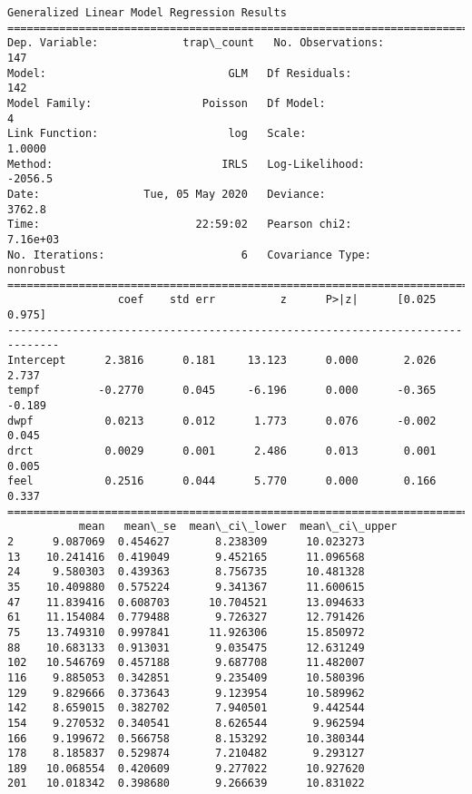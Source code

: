 \documentclass[11pt]{article}
\begin{document}
    \begin{Verbatim}[commandchars=\\\{\}]
                 Generalized Linear Model Regression Results                  
==============================================================================
Dep. Variable:             trap\_count   No. Observations:                  147
Model:                            GLM   Df Residuals:                      142
Model Family:                 Poisson   Df Model:                            4
Link Function:                    log   Scale:                          1.0000
Method:                          IRLS   Log-Likelihood:                -2056.5
Date:                Tue, 05 May 2020   Deviance:                       3762.8
Time:                        22:59:02   Pearson chi2:                 7.16e+03
No. Iterations:                     6   Covariance Type:             nonrobust
==============================================================================
                 coef    std err          z      P>|z|      [0.025      0.975]
------------------------------------------------------------------------------
Intercept      2.3816      0.181     13.123      0.000       2.026       2.737
tempf         -0.2770      0.045     -6.196      0.000      -0.365      -0.189
dwpf           0.0213      0.012      1.773      0.076      -0.002       0.045
drct           0.0029      0.001      2.486      0.013       0.001       0.005
feel           0.2516      0.044      5.770      0.000       0.166       0.337
==============================================================================
           mean   mean\_se  mean\_ci\_lower  mean\_ci\_upper
2      9.087069  0.454627       8.238309      10.023273
13    10.241416  0.419049       9.452165      11.096568
24     9.580303  0.439363       8.756735      10.481328
35    10.409880  0.575224       9.341367      11.600615
47    11.839416  0.608703      10.704521      13.094633
61    11.154084  0.779488       9.726327      12.791426
75    13.749310  0.997841      11.926306      15.850972
88    10.683133  0.913031       9.035475      12.631249
102   10.546769  0.457188       9.687708      11.482007
116    9.885053  0.342851       9.235409      10.580396
129    9.829666  0.373643       9.123954      10.589962
142    8.659015  0.382702       7.940501       9.442544
154    9.270532  0.340541       8.626544       9.962594
166    9.199672  0.566758       8.153292      10.380344
178    8.185837  0.529874       7.210482       9.293127
189   10.068554  0.420609       9.277022      10.927620
201   10.018342  0.398680       9.266639      10.831022

\end{Verbatim}
\end{document}
